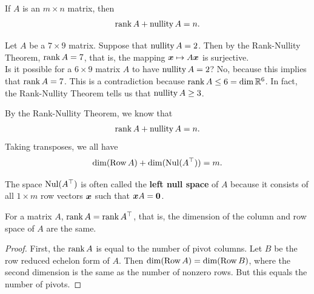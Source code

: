 \begin{Thm} If $A$ is an $m\times n$ matrix, then 
\[\operatorname*{rank} A + \operatorname*{nullity} A = n.\]
\end{Thm}\vs


\begin{Exam} Let $A$ be a $7\times 9$ matrix. Suppose that $\operatorname*{nullity} A = 2$. Then by the Rank-Nullity Theorem, $\operatorname*{rank} A = 7$, that is, the mapping $\boldsymbol x \mapsto A\boldsymbol x$ is surjective.\\

Is it possible for a $6\times 9$ matrix $A$  to have $\operatorname*{nullity} A = 2$? No, because this implies that $\operatorname*{rank} A = 7$. This is a contradiction because $\operatorname*{rank} A \le 6 = \dim \mathbb{R}^6$. In fact, the Rank-Nullity Theorem tells us that $\operatorname*{nullity} A \ge 3$.
\end{Exam}\vs



By the Rank-Nullity Theorem, we know that
\[\operatorname*{rank} A + \operatorname*{nullity} A = n.\] Taking transposes, we all have 
\[\dim(\operatorname*{Row} A) + \dim(\operatorname{Nul}(A^\top) ) = m.\] \vs

\begin{Rem} The space $\operatorname{Nul}(A^\top)$ is often called the \textbf{left null space} of $A$ because it consists of all $ 1\times m$ row vectors $\boldsymbol x$ such that $\boldsymbol xA = \boldsymbol 0$.
\end{Rem}\vs

\begin{Thm} For a matrix $A$, $\operatorname*{rank} A = \operatorname*{rank} A^\top$, that is, the dimension of the column and row space of $A$ are the same. 
\end{Thm}
\begin{proof}
First, the $\operatorname*{rank} A$ is equal to the number of pivot columns. Let $B$ be the row reduced echelon form of $A$. Then $\dim (\operatorname*{Row} A) = \dim (\operatorname*{Row} B)$, where the second dimension is the same as the number of nonzero rows. But this equals the number of pivots.
\end{proof}\vs


